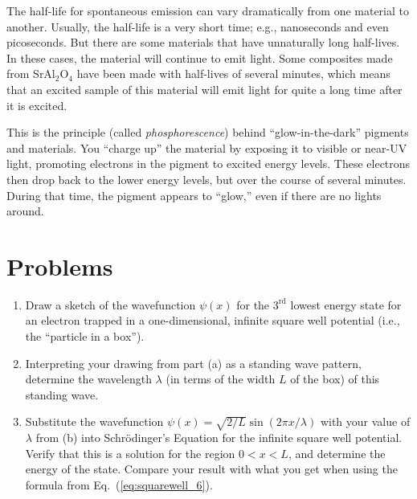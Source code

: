 The half-life for spontaneous emission can vary dramatically from one
material to another. Usually, the half-life is a very short time; e.g.,
nanoseconds and even picoseconds. But there are some materials that have
unnaturally long half-lives.  In these cases, the material will continue
to emit light. Some composites made from SrAl$_2$O$_4$ have been made
with half-lives of several minutes, which means that an excited sample of
this material will emit light for quite a long time after it is excited.

This is the principle (called {\it phosphorescence}) behind ``glow-in-the-dark''
pigments and materials. You ``charge up'' the material by exposing
it to visible or near-UV light, promoting electrons in the pigment
to excited energy levels.  These electrons then drop back to the
lower energy levels, but over the course of several minutes. During that
time, the pigment appears to ``glow,'' even if there are no lights
around.
%
\newpage


\section*{Problems}




\begin{problem}
\begin{enumerate}
\item Draw a sketch of the wavefunction $\psi(x)$ for the $3^\text{rd}$ 
lowest energy
state for an electron trapped in a one-dimensional, infinite square well 
potential (i.e., the ``particle in a box'').
\item Interpreting your drawing from part (a) as a standing wave pattern, determine the 
wavelength $\lambda$ (in terms of the width $L$ of the box)
of this standing wave. 
\item Substitute the wavefunction $\psi(x) = \sqrt{2/L}\sin(2\pi x/\lambda)$
with your value of $\lambda$ from (b)
into Schr\"{o}dinger's Equation for the infinite square well potential. Verify 
that this is a solution for the
region $0 < x < L$, and determine the energy of the state. Compare your
result with what you get when using the formula from 
Eq.~(\ref{eq:squarewell_6}).
\end{enumerate}
\label{prob:PinBox}
\end{problem}


